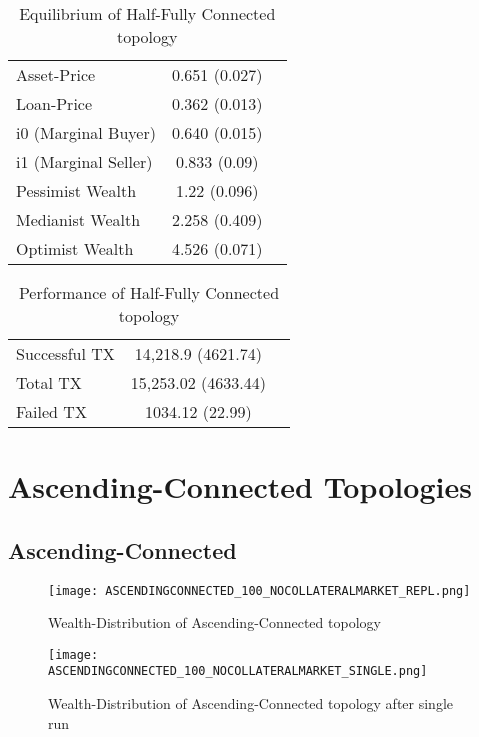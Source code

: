 \documentclass[Bachelorarbeit.tex]{subfiles}
\begin{document}
\begin{table}[H]
	\caption{Equilibrium of Half-Fully Connected topology}
	\centering
	\begin{tabular} { l c r }
		\hline
		Asset-Price & 0.651 (0.027) \\
		Loan-Price & 0.362 (0.013) \\
		i0 (Marginal Buyer) & 0.640 (0.015) \\
		i1 (Marginal Seller) & 0.833 (0.09) \\
		Pessimist Wealth & 1.22 (0.096) \\
		Medianist Wealth & 2.258 (0.409) \\
		Optimist Wealth & 4.526 (0.071) \\
		\hline
	\end{tabular}
\end{table} 

\begin{table}[H]
	\caption{Performance of Half-Fully Connected topology}
	\centering
	\begin{tabular} { l c r }
		\hline
		Successful TX & 14,218.9 (4621.74) \\
		Total TX & 15,253.02 (4633.44) \\
		Failed TX & 1034.12 (22.99) \\
		\hline
	\end{tabular}
\end{table}

\section{Ascending-Connected Topologies} 

\subsection{Ascending-Connected}
\begin{figure}[H]
	\centering
  \texttt{[image: ASCENDINGCONNECTED\_100\_NOCOLLATERALMARKET\_REPL.png]}
	\caption{Wealth-Distribution of Ascending-Connected topology}
	\label{fig1}
\end{figure}

\begin{figure}[H]
	\centering
  \texttt{[image: ASCENDINGCONNECTED\_100\_NOCOLLATERALMARKET\_SINGLE.png]}
	\caption{Wealth-Distribution of Ascending-Connected topology after single run}
	\label{fig1}
\end{figure}
\end{document}
